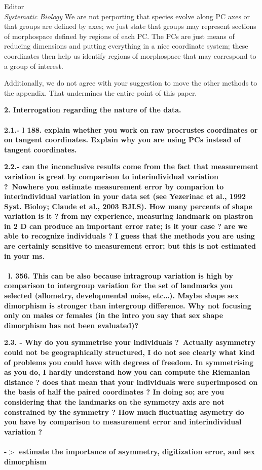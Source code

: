 \documentclass{letter}
\begin{document}
\begin{letter}{Editor \\ \textit{Systematic Biology}}
  We are not perporting that species evolve along PC axes or that groups are defined by axes; we just state that groups may represent sections of morphospace defined by regions of each PC. The PCs are just means of reducing dimensions and putting everything in a nice coordinate system; these coordinates then help us identify regions of morphospace that may correspond to a group of interest.

  Additionally, we do not agree with your suggestion to move the other methods to the appendix. That undermines the entire point of this paper.


  \textbf{2. Interrogation regarding the nature of the data. \\\\
  2.1.- l 188. explain whether you work on raw procrustes coordinates or on tangent coordinates. Explain why you are using PCs instead of tangent coordinates. }


  \textbf{2.2.- can the inconclusive results come from the fact that measurement variation is great by comparison to interindividual variation ? Nowhere you estimate measurement error by comparion to interindividual variation in your data set (see Yezerinac et al., 1992 Syst. Bioloy; Claude et al., 2003 BJLS). How many percents of shape variation is it ? from my experience, measuring landmark on plastron in 2 D can produce an important error rate; is it your case ? are we able to recognize individuals ? I guess that the methods you are using are certainly sensitive to measurement error; but this is not estimated in your ms.\\\\
   l. 356. This can be also because intragroup variation is high by comparison to intergroup variation for the set of landmarks you selected (allometry, developmental noise, etc\ldots). Maybe shape sex dimorphism is stronger than intergroup difference. Why not focusing only on males or females (in the intro you say that sex shape dimorphism has not been evaluated)? }


  \textbf{2.3. - Why do you symmetrise your individuals ? Actually asymmetry could not be geographically structured, I do not see clearly what kind of problems you could have with degrees of freedom. In symmetrising as you do, I hardly understand how you can compute the Riemanian distance ? does that mean that your individuals were superimposed on the basis of half the paired coordinates ? In doing so; are you considering that the landmarks on the symmetry axis are not constrained by the symmetry ? How much fluctuating asymetry do you have by comparison to measurement error and interindividual variation ? \\\\
  -\(>\) estimate the importance of asymmetry, digitization error, and sex dimorphism }


\end{letter}
\end{document}
